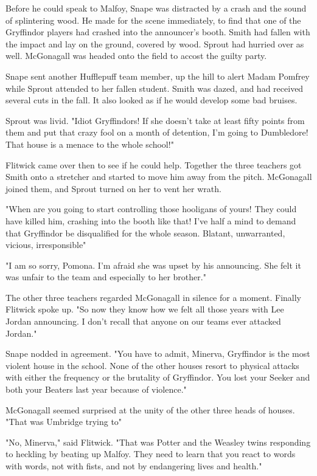 Before he could speak to Malfoy, Snape was distracted by a crash and the sound of splintering wood. He made for the scene immediately, to find that one of the Gryffindor players had crashed into the announcer's booth. Smith had fallen with the impact and lay on the ground, covered by wood. Sprout had hurried over as well. McGonagall was headed onto the field to accost the guilty party.

Snape sent another Hufflepuff team member, up the hill to alert Madam Pomfrey while Sprout attended to her fallen student. Smith was dazed, and had received several cuts in the fall. It also looked as if he would develop some bad bruises.

Sprout was livid. "Idiot Gryffindors! If she doesn't take at least fifty points from them and put that crazy fool on a month of detention, I'm going to Dumbledore! That house is a menace to the whole school!"

Flitwick came over then to see if he could help. Together the three teachers got Smith onto a stretcher and started to move him away from the pitch. McGonagall joined them, and Sprout turned on her to vent her wrath.

"When are you going to start controlling those hooligans of yours! They could have killed him, crashing into the booth like that! I've half a mind to demand that Gryffindor be disqualified for the whole season. Blatant, unwarranted, vicious, irresponsible{\el}"

"I am so sorry, Pomona. I'm afraid she was upset by his announcing. She felt it was unfair to the team and especially to her brother."

The other three teachers regarded McGonagall in silence for a moment. Finally Flitwick spoke up. "So now they know how we felt all those years with Lee Jordan announcing. I don't recall that anyone on our teams ever attacked Jordan."

Snape nodded in agreement. "You have to admit, Minerva, Gryffindor is the most violent house in the school. None of the other houses resort to physical attacks with either the frequency or the brutality of Gryffindor. You lost your Seeker and both your Beaters last year because of violence."

McGonagall seemed surprised at the unity of the other three heads of houses. "That was Umbridge trying to{\el}"

"No, Minerva," said Flitwick. "That was Potter and the Weasley twins responding to heckling by beating up Malfoy. They need to learn that you react to words with words, not with fists, and not by endangering lives and health."

